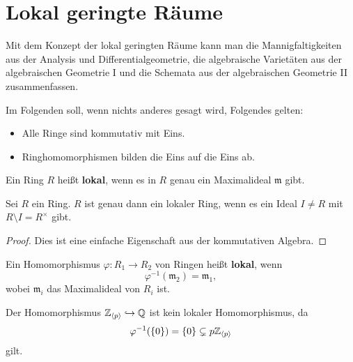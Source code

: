 
\chapter{Lokal geringte Räume}

Mit dem Konzept der lokal geringten Räume kann man die Mannigfaltigkeiten aus der Analysis und Differentialgeometrie, die algebraische Varietäten aus der algebraischen Geometrie I und die Schemata aus der algebraischen Geometrie II zusammenfassen.

\begin{bem}
	Im Folgenden soll, wenn nichts anderes gesagt wird, Folgendes gelten:
	\begin{itemize}
	 	\item Alle Ringe sind kommutativ mit Eins.
	 	\item Ringhomomorphismen bilden die Eins auf die Eins ab.
	 \end{itemize}
\end{bem}

\begin{bem*}
	Ein Ring $R$ heißt \textbf{lokal}, wenn es in $R$ genau ein Maximalideal $\mathfrak{m}$ gibt.
\end{bem*}

\begin{prop}
\label{prop:2.2}
	Sei $R$ ein Ring. $R$ ist genau dann ein lokaler Ring, wenn es ein Ideal $I \neq R$ mit $R\setminus I = R^\times$ gibt.
	\begin{proof}
		Dies ist eine einfache Eigenschaft aus der kommutativen Algebra.
	\end{proof}
\end{prop}

\begin{defn}
	Ein Homomorphismus $\varphi\colon R_1 \to R_2$ von Ringen heißt \textbf{lokal}, wenn
	\[
		\varphi^{-1}(\mathfrak{m}_2) = \mathfrak{m}_1,
	\]
	wobei $\mathfrak{m}_i$ das Maximalideal von $R_i$ ist.
\end{defn}

\begin{bsp*}
	Der Homomorphismus $\mathbb {Z}_{\langle p \rangle} \hookrightarrow \mathbb {Q}$ ist kein lokaler Homomorphismus, da
	\[
		\varphi^{-1}(\{0\}) = \{0\} \subsetneq p\mathbb {Z}_{\langle p \rangle}
	\]
	gilt.
\end{bsp*}

